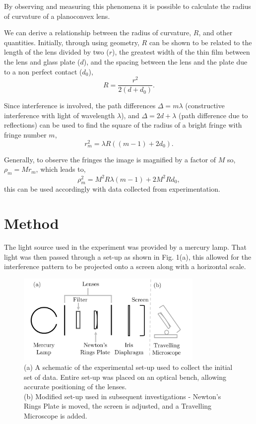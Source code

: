 \documentclass[twocolumn]{revtex4}
\begin{document}
By observing and measuring this phenomena it is possible to calculate the radius of curvature of a planoconvex lens.

We can derive a relationship between the radius of curvature, $R$, and other quantities. Initially, through using geometry, $R$ can be shown to be related to the length of the lens divided by two ($r$), the greatest width of the thin film between the lens and glass plate ($d$), and the spacing between the lens and the plate due to a non perfect contact ($d_0$),
\begin{equation} \tag{1}
R=\frac{r^2}{2(d+d_0)}.
\end{equation}

Since interference is involved, the path differences $\Delta=m\lambda$ (constructive interference with light of wavelength $\lambda$), and $\Delta=2d+\lambda$ (path difference due to reflections) can be used to find the square of the radius of a bright fringe with fringe number $m$,
\begin{equation} \tag{2}
r_m^2=\lambda{R((m-1)+2d_0)}.
\end{equation}

Generally, to observe the fringes the image is magnified by a factor of $M$ so, $\rho_m=Mr_m$, which leads to, 
\begin{equation} \tag{3}
\rho_m^2=M^2R\lambda{(m-1)}+2M^2Rd_0,
\end{equation}
this can be used accordingly with data collected from experimentation.
\\

\vspace{-3ex}
\section{Method} 
\vspace{-2ex}
The light source used in the experiment was provided by a mercury lamp. That light was then passed through a set-up as shown in Fig. 1(a), this allowed for the interference pattern to be projected onto a screen along with a horizontal scale. 

\begin{figure}[!h]
\begin{center}
\includegraphics[width=9cm]{fig1}
\caption[]{(a) A schematic of the experimental set-up used to collect the initial set of data. Entire set-up was placed on an optical bench, allowing accurate positioning of the lenses.
\\
(b) Modified set-up used in subsequent investigations - Newton's Rings Plate is moved, the screen is adjusted, and a Travelling Microscope is added.}
\label{fig:fig1}
\end{center}
\end{figure}
\end{document}
